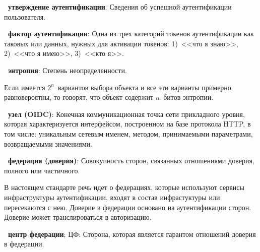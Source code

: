 {\bf \thedefctr~утверждение аутентификации}:
Сведения об успешной аутентификации пользователя.

{\bf \thedefctr~фактор аутентификации}:
Одна из трех категорий токенов аутентификации как таковых
или данных, нужных для активации токенов:
1)~<<что я знаю>>, 2)~<<что я имею>>, 3)~<<кто я>>.


{\bf \thedefctr~энтропия}:
Степень неопределенности. 

\begin{note*}
Если имеется $2^n$~вариантов выбора объекта и все эти варианты примерно
равновероятны, то говорят, что объект содержит $n$~битов энтропии.
\end{note*}

{\bf \thedefctr~узел (OIDC)}:
Конечная коммуникационная точка сети прикладного уровня,
которая характеризуется интерфейсом, построенном на базе протокола HTTP,  
в том числе: уникальным сетевым именем, методом, принимаемыми параметрами,
возвращаемыми значениями.


{\bf \thedefctr~федерация (доверия)}:
Совокупность сторон, связанных отношениями доверия, полного или частичного.

\begin{note*}
В настоящем стандарте речь идет о федерациях, которые используют 
сервисы инфраструктуры аутентификации, входят в состав инфрастуктуры или 
пересекаются с нею. 
%
Доверие в федерации основано на аутентификации сторон.
Доверие может транслироваться в авторизацию. 
\end{note*}



{\bf \thedefctr~центр федерации}; ЦФ:
Сторона, которая является гарантом отношений доверия в федерации.



